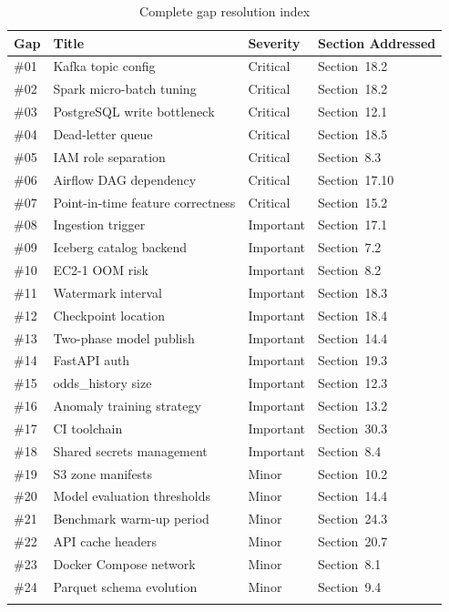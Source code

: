 \documentclass[11pt,a4paper]{article}
\begin{document}
\begin{longtable}{L{1cm}L{3.5cm}L{2.5cm}L{7cm}}
\toprule
\textbf{Gap} & \textbf{Title} & \textbf{Severity} & \textbf{Section Addressed} \\
\midrule
\endhead
\#01 & Kafka topic config & Critical & Section~18.2 \\
\#02 & Spark micro-batch tuning & Critical & Section~18.2 \\
\#03 & PostgreSQL write bottleneck & Critical & Section~12.1 \\
\#04 & Dead-letter queue & Critical & Section~18.5 \\
\#05 & IAM role separation & Critical & Section~8.3 \\
\#06 & Airflow DAG dependency & Critical & Section~17.10 \\
\#07 & Point-in-time feature correctness & Critical & Section~15.2 \\
\#08 & Ingestion trigger & Important & Section~17.1 \\
\#09 & Iceberg catalog backend & Important & Section~7.2 \\
\#10 & EC2-1 OOM risk & Important & Section~8.2 \\
\#11 & Watermark interval & Important & Section~18.3 \\
\#12 & Checkpoint location & Important & Section~18.4 \\
\#13 & Two-phase model publish & Important & Section~14.4 \\
\#14 & FastAPI auth & Important & Section~19.3 \\
\#15 & odds\_history size & Important & Section~12.3 \\
\#16 & Anomaly training strategy & Important & Section~13.2 \\
\#17 & CI toolchain & Important & Section~30.3 \\
\#18 & Shared secrets management & Important & Section~8.4 \\
\#19 & S3 zone manifests & Minor & Section~10.2 \\
\#20 & Model evaluation thresholds & Minor & Section~14.4 \\
\#21 & Benchmark warm-up period & Minor & Section~24.3 \\
\#22 & API cache headers & Minor & Section~20.7 \\
\#23 & Docker Compose network & Minor & Section~8.1 \\
\#24 & Parquet schema evolution & Minor & Section~9.4 \\
\bottomrule
\caption{Complete gap resolution index}
\end{longtable}
\end{document}

